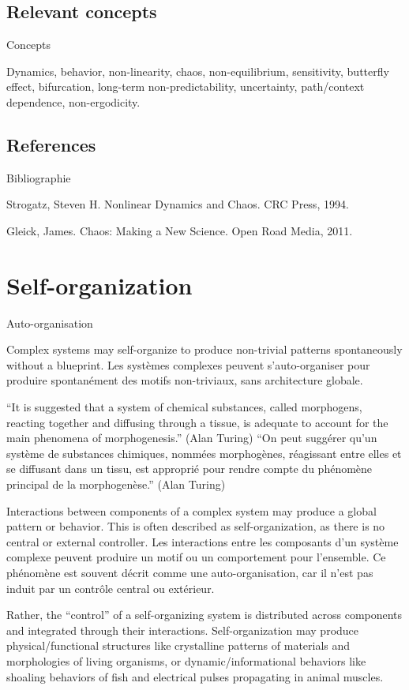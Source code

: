 \documentclass[12pt]{article}
\begin{document}
\subsection*{Relevant concepts}{Concepts}

Dynamics, behavior, non-linearity, chaos, non-equilibrium, sensitivity, butterfly effect, bifurcation, long-term non-predictability, uncertainty, path/context dependence, non-ergodicity.



\subsection*{References}{Bibliographie}

Strogatz, Steven H. Nonlinear Dynamics and Chaos. CRC Press, 1994.


Gleick, James. Chaos: Making a New Science. Open Road Media, 2011.


	
	
\section{Self-organization}{Auto-organisation}
	
	
Complex systems may self-organize to produce non-trivial patterns spontaneously without a blueprint.
Les systèmes complexes peuvent s'auto-organiser pour produire spontanément des motifs non-triviaux, sans architecture globale.
	
	
``It is suggested that a system of chemical substances, called morphogens, reacting together and diffusing through a tissue, is adequate to account for the main phenomena of morphogenesis.'' (Alan Turing)
``On peut suggérer qu'un système de substances chimiques, nommées morphogènes, réagissant entre elles et se diffusant dans un tissu, est approprié pour rendre compte du phénomène principal de la morphogenèse.'' (Alan Turing)


Interactions between components of a complex system may produce a global pattern or behavior. This is often described as self-organization, as there is no central or external controller.
Les interactions entre les composants d'un système complexe peuvent produire un motif ou un comportement pour l'ensemble. Ce phénomène est souvent décrit comme une auto-organisation, car il n'est pas induit par un contrôle central ou extérieur.

Rather, the ``control'' of a self-organizing system is distributed across components and integrated through their interactions. Self-organization may produce physical/functional structures like crystalline patterns of materials and morphologies of living organisms, or dynamic/informational behaviors like shoaling behaviors of fish and electrical pulses propagating in animal muscles.
\end{document}
